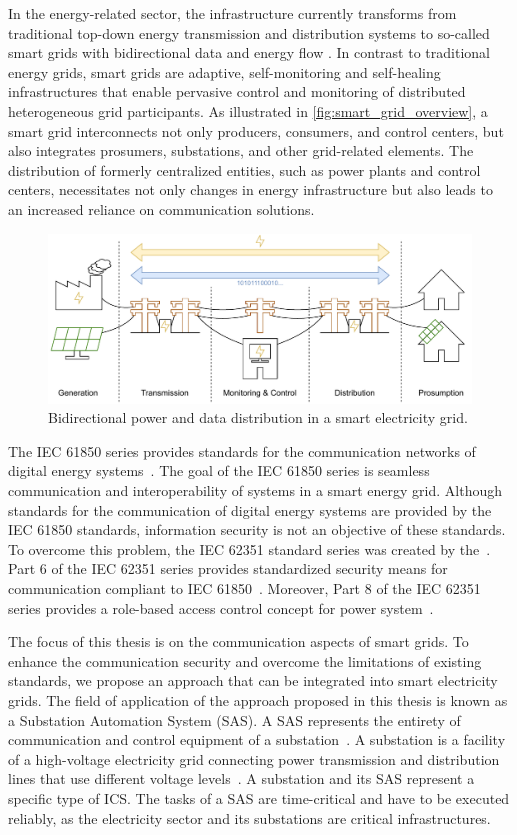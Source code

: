 In the energy-related sector, the infrastructure currently transforms from traditional top-down energy transmission and distribution systems to so-called smart grids with bidirectional data and energy flow \cite{Fang2012}.
In contrast to traditional energy grids, smart grids are adaptive, self-monitoring and self-healing infrastructures that enable pervasive control and monitoring of distributed heterogeneous grid participants.
As illustrated in \autoref{fig:smart_grid_overview}, a smart grid interconnects not only producers, consumers, and control centers, but also integrates prosumers, substations, and other grid-related elements.
The distribution of formerly centralized entities, such as power plants and control centers, necessitates not only changes in energy infrastructure but also leads to an increased reliance on communication solutions.
\begin{figure}
    \centering
    \includegraphics[width=.9\linewidth]{figures/smart_grid_overview_extended_color.drawio.pdf}
    \caption{Bidirectional power and data distribution in a smart electricity grid.}
    \label{fig:smart_grid_overview}
\end{figure}

The IEC 61850 series provides standards for the communication networks of digital energy systems~\cite{IEC61850P5}.
The goal of the IEC 61850 series is seamless communication and interoperability of systems in a smart energy grid.
Although standards for the communication of digital energy systems are provided by the IEC 61850 standards, information security is not an objective of these standards.
To overcome this problem, the IEC 62351 standard series was created by the~\citeauthor{IEC62351P6}.
Part 6 of the IEC 62351 series provides standardized security means for communication compliant to IEC 61850~\cite{IEC62351P6}.
Moreover, Part 8 of the IEC 62351 series provides a role-based access control concept for power system~\cite{IEC62351P8}.

The focus of this thesis is on the communication aspects of smart grids.
To enhance the communication security and overcome the limitations of existing standards, we propose an approach that can be integrated into smart electricity grids.
The field of application of the approach proposed in this thesis is known as a Substation Automation System (SAS).
A SAS represents the entirety of communication and control equipment of a substation~\cite{Padilla2015}.
A substation is a facility of a high-voltage electricity grid connecting power transmission and distribution lines that use different voltage levels~\cite{oshaSubstation}.
A substation and its SAS represent a specific type of ICS.
The tasks of a SAS are time-critical and have to be executed reliably, as the electricity sector and its substations are critical infrastructures.

